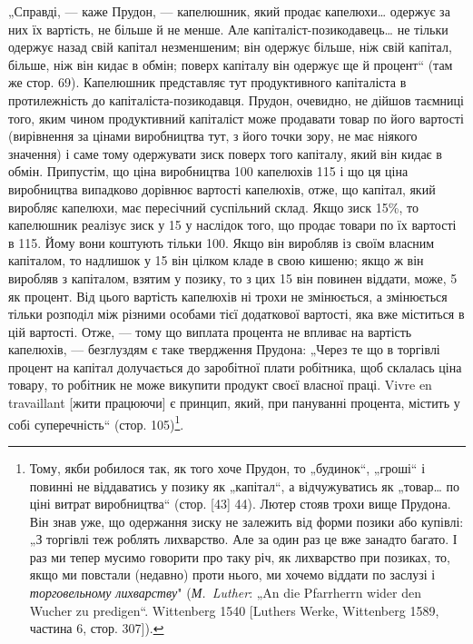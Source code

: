 „Справді, — каже Прудон, — капелюшник, який продає капелюхи\dots{}
одержує за них їх вартість, не більше й не менше. Але
капіталіст-позикодавець\dots{} не тільки одержує назад свій капітал
незменшеним; він одержує більше, ніж свій капітал, більше, ніж
він кидає в обмін; поверх капіталу він одержує ще й процент“
(там же стор. 69). Капелюшник представляє тут продуктивного
капіталіста в протилежність до капіталіста-позикодавця.
Прудон, очевидно, не дійшов таємниці того, яким чином продуктивний
капіталіст може продавати товар по його вартості (вирівнення
за цінами виробництва тут, з його точки зору, не має
ніякого значення) і саме тому одержувати зиск поверх того капіталу,
який він кидає в обмін. Припустім, що ціна виробництва
100 капелюхів \deq{} 115 і що ця ціна виробництва
випадково дорівнює вартості капелюхів, отже, що капітал,
який виробляє капелюхи, має пересічний суспільний склад.
Якщо зиск \deq{} 15\%, то капелюшник реалізує зиск у 15
у наслідок того, що продає товари по їх вартості в 115.
Йому вони коштують тільки 100. Якщо він
виробляв із своїм власним капіталом, то надлишок у 15 він цілком кладе в свою кишеню; якщо ж він виробляв
з капіталом, взятим у позику, то з цих 15
він повинен віддати, може, 5 як процент.
Від цього вартість капелюхів ні трохи не змінюється, а змінюється
тільки розподіл між різними особами тієї додаткової
вартості, яка вже міститься в цій вартості. Отже, — тому що
виплата процента не впливає на вартість капелюхів, — безглуздям
є таке твердження Прудона: „Через те що в торгівлі процент
на капітал долучається до заробітної плати робітника, щоб склалась
ціна товару, то робітник не може викупити продукт своєї
власної праці. Vivre en travaillant [жити працюючи] є принцип,
який, при пануванні процента, містить у собі суперечність“
(стор. 105)\footnote{
Тому, якби робилося так, як того хоче Прудон, то „будинок“, „гроші“
і~ повинні не віддаватись у позику як „капітал“, а відчужуватись як „товар\dots{}
по ціні витрат виробництва“ (стор. [43] 44). Лютер стояв трохи вище
Прудона. Він знав уже, що одержання зиску не залежить від форми позики
або купівлі: „З торгівлі теж роблять лихварство. Але за один раз це вже занадто
багато. І раз ми тепер мусимо говорити про таку річ, як лихварство
при позиках, то, якщо ми повстали (недавно) проти нього, ми хочемо віддати
по заслузі і \emph{торговельному лихварству}" (\emph{М.~Luther}: „An die Pfarrherrn wider
den Wucher zu predigen“. Wittenberg 1540 [Luthers Werke, Wittenberg 1589, частина
6, стор. 307]).
}.

